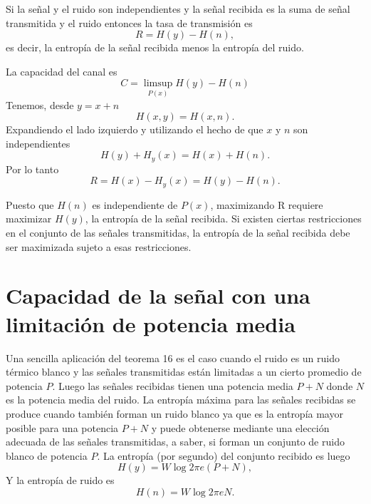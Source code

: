\begin{theorem}	
\label{t16}
Si la se\~nal y el ruido son independientes y la se\~nal recibida es
la suma de se\~nal transmitida y el ruido entonces la tasa de
transmisi\'on es
\begin{equation}
R = H(y) - H(n),
\end{equation}
es decir, la entrop\'ia de la se\~nal recibida menos la entrop\'ia del
ruido.
\end{theorem}

La capacidad del canal es
\begin{equation}
C = \limsup_{P(x)} H(y) - H(n)
\end{equation}
Tenemos, desde $y = x+n$
\begin{equation}
H(x,y) = H(x,n).
\end{equation}
Expandiendo el lado izquierdo y utilizando el hecho de que $x$ y $n$
son independientes
\begin{equation}
H(y) + H_{y}(x) = H(x) + H(n).
\end{equation}
Por lo tanto
\begin{equation}
R = H(x) - H_{y}(x) = H(y) - H(n).
\end{equation}
	
Puesto que $H(n)$ es independiente de $P(x)$, maximizando R requiere
maximizar $H(y)$, la entrop\'ia de la se\~nal recibida. Si existen
ciertas restricciones en el conjunto de las se\~nales transmitidas, la
entrop\'ia de la se\~nal recibida debe ser maximizada sujeto a esas
restricciones.
	
\section{Capacidad de la se\~nal  con una limitaci\'on de potencia media}
\label{s25}

Una sencilla aplicaci\'on del teorema 16 es el caso cuando el ruido es
un ruido t\'ermico blanco y las se\~nales transmitidas est\'an
limitadas a un cierto promedio de potencia $P$. Luego las se\~nales
recibidas tienen una potencia media $P + N$ donde $N$ es la potencia
media del ruido. La entrop\'ia m\'axima para las se\~nales recibidas
se produce cuando tambi\'en forman un ruido blanco ya que es la
entrop\'ia mayor posible para una potencia $P + N$ y puede obtenerse
mediante una elecci\'on adecuada de las se\~nales transmitidas, a
saber, si forman un conjunto de ruido blanco de potencia $P$. La
entrop\'ia (por segundo) del conjunto recibido es luego
\begin{equation}
H(y) = W\log 2\pi e(P+N),
\end{equation}
Y la entrop\'ia de ruido es
\begin{equation}
H(n) = W\log 2\pi eN.
\end{equation}
	
